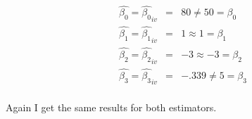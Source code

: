\documentclass[11pt]{SelfArxOneColBMN}
\begin{document}
\begin{enumerate}
\begin{enumerate}
\begin{solution}
      \begin{eqnarray*}
          \hat{\beta_0} = \hat{\beta_0}_{iv} &=& 80  \neq 50 = \beta_0\\
          \hat{\beta_1} = \hat{\beta_1}_{iv} &=& 1 \approx 1 = \beta_1\\
          \hat{\beta_2} = \hat{\beta_2}_{iv} &=& -3 \approx -3 = \beta_2\\
          \hat{\beta_3} = \hat{\beta_3}_{iv} &=& -.339 \neq 5 = \beta_3\\
        \end{eqnarray*}
    \end{solution}
    Again I get the same results for both estimators.
  \end{enumerate}
\end{enumerate}
\end{document}
